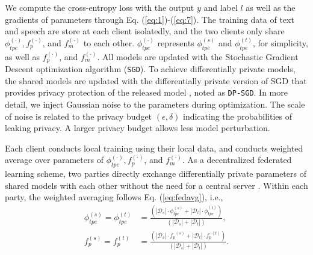 \documentclass[11pt]{article}
\begin{document}
{
We compute the cross-entropy loss with the output $y$ and label $l$ as well as the gradients of parameters through Eq. (\ref{eq:1})-(\ref{eq:7}). The training data of text and speech are store at each client isolatedly, and the two clients only share ${\phi}_{tpe}^{(\cdot)}, {f}_{p}^{(\cdot)}$,  and ${f}_m^{(\cdot)}$ to each other. ${\phi}_{tpe}^{(\cdot)}$ represents ${\phi}_{tpe}^{(s)}$ and ${\phi}_{tpe}^{(t)}$, for simplicity, as well as ${f}_{p}^{(\cdot)}$, and ${f}_m^{(\cdot)}$.  All models are updated with  the Stochastic Gradient Descent optimization algorithm (\texttt{SGD}). To achieve differentially private models, the shared models are updated with the differentially private version of SGD that provides privacy protection of the released model \cite{Xueyang-abadi2016deep}, noted as \texttt{DP-SGD}. In more detail, we inject Gaussian noise \cite{Xueyang-dwork2014algorithmic} to the parameters during optimization. The scale of noise is related to the privacy budget $(\epsilon, \delta)$ indicating the probabilities of leaking privacy. A larger privacy budget allows less model perturbation.


Each client conducts local training using their local data, and conducts weighted average over parameters of ${\phi}_{tpe}^{(\cdot)}, {f}_{p}^{(\cdot)}$,  and ${f}_m^{(\cdot)}$. As a  decentralized federated learning scheme, two parties directly exchange differentially private parameters of shared models with each other without the need for a central server \cite{Xueyang-yang2020federated}. Within each party, the weighted averaging follows Eq. (\ref{eq:fedavg}), i.e.,
\begin{equation}
\begin{aligned}
    {\phi}_{tpe}^{(s)}={\phi}_{tpe}^{(t)} &= \frac{\left(|\mathcal{D}_s|\cdot{\phi}_{tpe}^{(s)}+|\mathcal{D}_t|\cdot{\phi}_{tpe}^{(t)}\right)}{\left(|\mathcal{D}_s|+|\mathcal{D}_t|\right)},\\
    {f}_{p}^{(s)}={f}_{p}^{(t)} &= \frac{\left(|\mathcal{D}_s|\cdot{f_p}^{(s)}+|\mathcal{D}_t|\cdot{f_p}^{(t)}\right)}{\left(|\mathcal{D}_s|+|\mathcal{D}_t|\right)}.
    \label{eq:fedavg}
\end{aligned}
\end{equation}
}
\end{document}

